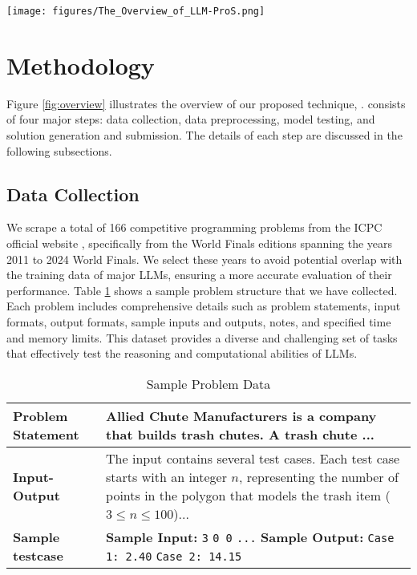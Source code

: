 \begin{figure*}[htbp]
\centerline{\texttt{[image: figures/The\_Overview\_of\_LLM-ProS.png]}}
\caption{The Overview of \Name{}}
\label{fig:overview}
\end{figure*}
\section{Methodology}
Figure \ref{fig:overview} illustrates the overview of our proposed technique, \Name{}. \Name{} consists of four major steps: data collection, data preprocessing, model testing, and solution generation and submission. The details of each step are discussed in the following subsections.

\subsection{Data Collection}
We scrape a total of 166 competitive programming problems from the ICPC official website \cite{b8}, specifically from the World Finals editions spanning the years 2011 to 2024 World Finals. We select these years to avoid potential overlap with the training data of major LLMs, ensuring a more accurate evaluation of their performance. Table \ref{tab:problemst} shows a sample problem structure that we have collected. Each problem includes comprehensive details such as problem statements, input formats, output formats, sample inputs and outputs, notes, and specified time and memory limits. This dataset provides a diverse and challenging set of tasks that effectively test the reasoning and computational abilities of LLMs.
\begin{table}[htbp]
\centering
\caption{Sample Problem Data}
\label{tab:problemst}
\begin{tabular}{|l|p{5cm}|}
\hline
\textbf{Problem Statement} & Allied Chute Manufacturers is a company that builds trash chutes. A trash chute ... \\
\hline
\textbf{Input-Output} & The input contains several test cases. Each test case starts with an integer $n$, representing the number of points in the polygon that models the trash item ($3 \leq n \leq 100$)... \\
\hline
\textbf{Sample testcase} & 
\textbf{Sample Input:} \newline
\texttt{3} \newline
\texttt{0 0} \newline
\texttt{...} \newline
\textbf{Sample Output:} \newline
\texttt{Case 1: 2.40} \newline
\texttt{Case 2: 14.15} \\
\hline
\end{tabular}
\end{table}

